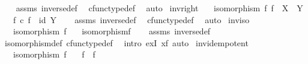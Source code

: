 \begin{isabellebody}
%
\isadelimproof
\ \ %
\endisadelimproof
%
\isatagproof
{}\isamarkupfalse%
\ assms\ inverse{\isacharunderscore}{\kern0pt}def{}\ \isamarkupfalse%
\ cfunc{\isacharunderscore}{\kern0pt}type{\isacharunderscore}{\kern0pt}def\ \isamarkupfalse%
\ auto%
\endisatagproof
{\isafoldproof}%
%
\isadelimproof
\isanewline
%
\endisadelimproof
\isanewline
{}\isamarkupfalse%
\ inv{\isacharunderscore}{\kern0pt}right{\isacharcolon}{\kern0pt}\isanewline
\ \ \ {\isachardoublequoteopen}isomorphism\ f{\isachardoublequoteclose}\ {\isachardoublequoteopen}f\ {\isacharcolon}{\kern0pt}\ X\ {\isasymrightarrow}\ Y{\isachardoublequoteclose}\isanewline
\ \ \ {\isachardoublequoteopen}f\ {\isasymcirc}\isactrlsub c\ f\isactrlbold {\isasyminverse}\ {\isacharequal}{\kern0pt}\ id\ Y{\isachardoublequoteclose}\isanewline
%
\isadelimproof
\ \ %
\endisadelimproof
%
\isatagproof
{}\isamarkupfalse%
\ assms\ inverse{\isacharunderscore}{\kern0pt}def{}\ \isamarkupfalse%
\ cfunc{\isacharunderscore}{\kern0pt}type{\isacharunderscore}{\kern0pt}def\ \isamarkupfalse%
\ auto%
\endisatagproof
{\isafoldproof}%
%
\isadelimproof
\isanewline
%
\endisadelimproof
\isanewline
{}\isamarkupfalse%
\ inv{\isacharunderscore}{\kern0pt}iso{\isacharcolon}{\kern0pt}\isanewline
\ \ \ {\isachardoublequoteopen}isomorphism\ f{\isachardoublequoteclose}\isanewline
\ \ \ {\isachardoublequoteopen}isomorphism{\isacharparenleft}{\kern0pt}f\isactrlbold {\isasyminverse}{\isacharparenright}{\kern0pt}{\isachardoublequoteclose}\isanewline
%
\isadelimproof
\ \ %
\endisadelimproof
%
\isatagproof
{}\isamarkupfalse%
\ assms\ inverse{\isacharunderscore}{\kern0pt}def{}\ \isamarkupfalse%
\ isomorphism{\isacharunderscore}{\kern0pt}def\ cfunc{\isacharunderscore}{\kern0pt}type{\isacharunderscore}{\kern0pt}def\ \isamarkupfalse%
\ {\isacharparenleft}{\kern0pt}intro\ exI{\isacharbrackleft}{\kern0pt}\ x{\isacharequal}{\kern0pt}f{\isacharbrackright}{\kern0pt}{\isacharcomma}{\kern0pt}\ auto{\isacharparenright}{\kern0pt}%
\endisatagproof
{\isafoldproof}%
%
\isadelimproof
\isanewline
%
\endisadelimproof
\isanewline
{}\isamarkupfalse%
\ inv{\isacharunderscore}{\kern0pt}idempotent{\isacharcolon}{\kern0pt}\isanewline
\ \ \ {\isachardoublequoteopen}isomorphism\ f{\isachardoublequoteclose}\isanewline
\ \ \ {\isachardoublequoteopen}{\isacharparenleft}{\kern0pt}f\isactrlbold {\isasyminverse}{\isacharparenright}{\kern0pt}\isactrlbold {\isasyminverse}\ {\isacharequal}{\kern0pt}\ f{\isachardoublequoteclose}\isanewline

\end{isabellebody}
